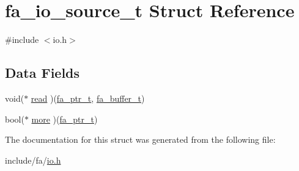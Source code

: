 \hypertarget{structfa__io__source__t}{\section{fa\-\_\-io\-\_\-source\-\_\-t Struct Reference}
\label{structfa__io__source__t}
}


{\ttfamily \#include $<$io.\-h$>$}

\subsection*{Data Fields}
\begin{DoxyCompactItemize}
\item 
void($\ast$ \hyperlink{group___fa_gac5a0b64895ac484c042788cb48518ec9}{read} )(\hyperlink{group___fa_ga915ddeae99ad7568b273d2b876425197}{fa\-\_\-ptr\-\_\-t}, \hyperlink{group___fa_buffer_ga0ed7a1d783ab322e2e8be02432d0839e}{fa\-\_\-buffer\-\_\-t})
\item 
bool($\ast$ \hyperlink{group___fa_ga4c4ed8722640b6114ae01cfc900c0bcd}{more} )(\hyperlink{group___fa_ga915ddeae99ad7568b273d2b876425197}{fa\-\_\-ptr\-\_\-t})
\end{DoxyCompactItemize}


The documentation for this struct was generated from the following file\-:\begin{DoxyCompactItemize}
\item 
include/fa/\hyperlink{io_8h}{io.\-h}\end{DoxyCompactItemize}
